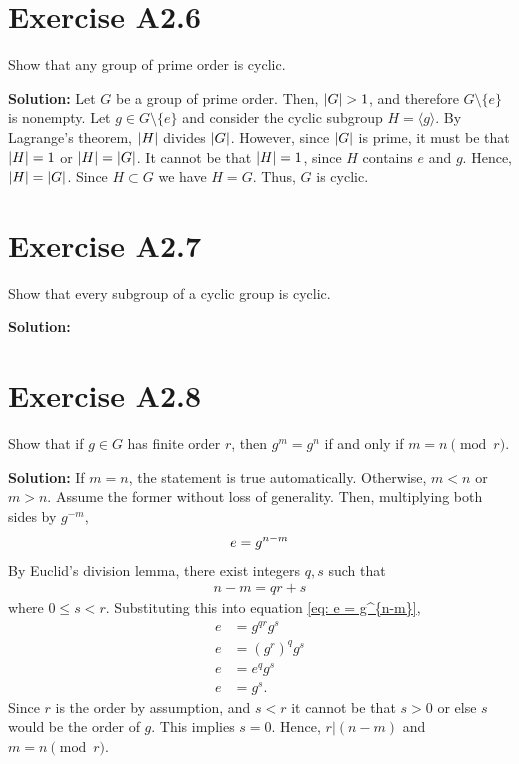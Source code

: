 \documentclass{book}
\begin{document}
\section*{Exercise A2.6}
    Show that any group of prime order is cyclic.
    
    \textbf{Solution:} Let $G$ be a group of prime order. Then, $\abs{G}>1$, and therefore $G\setminus\{e\}$ is nonempty. Let $g \in G\setminus\{e\}$ and consider the cyclic subgroup $H = \langle g \rangle$. By Lagrange's theorem, $\abs{H}$ divides $\abs{G}$. However, since $\abs{G}$ is prime, it must be that $\abs{H} = 1$ or $\abs{H} = \abs{G}$. It cannot be that $\abs{H} =1$, since $H$ contains $e$ and $g$. Hence, $\abs{H} = \abs{G}$. Since $H\subset G$ we have $H = G$. Thus, $G$ is cyclic.

\section*{Exercise A2.7}
    Show that every subgroup of a cyclic group is cyclic.
    
    \textbf{Solution:}

\section*{Exercise A2.8}
    Show that if $g\in G$ has finite order $r$, then $g^m = g^n$ if and only if $m=n\pmod{r}$.
    
    \textbf{Solution:} If $m=n$, the statement is true automatically. Otherwise, $m<n$ or $m>n$. Assume the former without loss of generality. Then, multiplying both sides by $g^{-m}$,
    \begin{align} \label{eq: e = g^{n-m}}
        e = g^{n-m}
    \end{align}
    By Euclid's division lemma, there exist integers $q, s$ such that
    \begin{align}
        n-m = qr + s
    \end{align}
    where $0\leq s < r$. Substituting this into equation \eqref{eq: e = g^{n-m}},
    \begin{align}
        e &= g^{qr}g^s \\
        e &= (g^r)^q g^s \\
        e &= e^q g^s \\
        e &= g^s.
    \end{align}
    Since $r$ is the order by assumption, and $s <r$ it cannot be that $s>0$ or else $s$ would be the order of $g$. This implies $s=0$. Hence, $r|(n-m)$ and $m = n \pmod r$.
\end{document}

